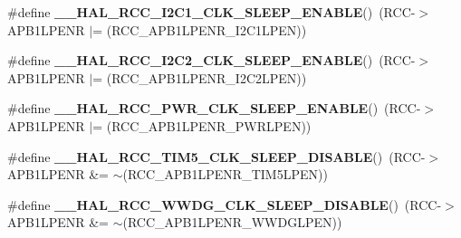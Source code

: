 \begin{DoxyCompactItemize}
\item 
\#define {\bfseries \+\_\+\+\_\+\+H\+A\+L\+\_\+\+R\+C\+C\+\_\+\+I2\+C1\+\_\+\+C\+L\+K\+\_\+\+S\+L\+E\+E\+P\+\_\+\+E\+N\+A\+B\+LE}()~(R\+CC-\/$>$A\+P\+B1\+L\+P\+E\+NR $\vert$= (R\+C\+C\+\_\+\+A\+P\+B1\+L\+P\+E\+N\+R\+\_\+\+I2\+C1\+L\+P\+EN))\hypertarget{group___r_c_c___a_p_b1___low_power___enable___disable_ga894dbeada170b01faef303d35de84917}{}\label{group___r_c_c___a_p_b1___low_power___enable___disable_ga894dbeada170b01faef303d35de84917}

\item 
\#define {\bfseries \+\_\+\+\_\+\+H\+A\+L\+\_\+\+R\+C\+C\+\_\+\+I2\+C2\+\_\+\+C\+L\+K\+\_\+\+S\+L\+E\+E\+P\+\_\+\+E\+N\+A\+B\+LE}()~(R\+CC-\/$>$A\+P\+B1\+L\+P\+E\+NR $\vert$= (R\+C\+C\+\_\+\+A\+P\+B1\+L\+P\+E\+N\+R\+\_\+\+I2\+C2\+L\+P\+EN))\hypertarget{group___r_c_c___a_p_b1___low_power___enable___disable_gac0167c77fa1c00add900bb1cf788e68c}{}\label{group___r_c_c___a_p_b1___low_power___enable___disable_gac0167c77fa1c00add900bb1cf788e68c}

\item 
\#define {\bfseries \+\_\+\+\_\+\+H\+A\+L\+\_\+\+R\+C\+C\+\_\+\+P\+W\+R\+\_\+\+C\+L\+K\+\_\+\+S\+L\+E\+E\+P\+\_\+\+E\+N\+A\+B\+LE}()~(R\+CC-\/$>$A\+P\+B1\+L\+P\+E\+NR $\vert$= (R\+C\+C\+\_\+\+A\+P\+B1\+L\+P\+E\+N\+R\+\_\+\+P\+W\+R\+L\+P\+EN))\hypertarget{group___r_c_c___a_p_b1___low_power___enable___disable_gacad9c9770ee2525fccf6a15e4ee7a07a}{}\label{group___r_c_c___a_p_b1___low_power___enable___disable_gacad9c9770ee2525fccf6a15e4ee7a07a}

\item 
\#define {\bfseries \+\_\+\+\_\+\+H\+A\+L\+\_\+\+R\+C\+C\+\_\+\+T\+I\+M5\+\_\+\+C\+L\+K\+\_\+\+S\+L\+E\+E\+P\+\_\+\+D\+I\+S\+A\+B\+LE}()~(R\+CC-\/$>$A\+P\+B1\+L\+P\+E\+NR \&= $\sim$(R\+C\+C\+\_\+\+A\+P\+B1\+L\+P\+E\+N\+R\+\_\+\+T\+I\+M5\+L\+P\+EN))\hypertarget{group___r_c_c___a_p_b1___low_power___enable___disable_gaac91e3596950c8d33760debce6b0e416}{}\label{group___r_c_c___a_p_b1___low_power___enable___disable_gaac91e3596950c8d33760debce6b0e416}

\item 
\#define {\bfseries \+\_\+\+\_\+\+H\+A\+L\+\_\+\+R\+C\+C\+\_\+\+W\+W\+D\+G\+\_\+\+C\+L\+K\+\_\+\+S\+L\+E\+E\+P\+\_\+\+D\+I\+S\+A\+B\+LE}()~(R\+CC-\/$>$A\+P\+B1\+L\+P\+E\+NR \&= $\sim$(R\+C\+C\+\_\+\+A\+P\+B1\+L\+P\+E\+N\+R\+\_\+\+W\+W\+D\+G\+L\+P\+EN))\hypertarget{group___r_c_c___a_p_b1___low_power___enable___disable_gae61c24ac6b36e7edbabc5b050b38d63e}{}\label{group___r_c_c___a_p_b1___low_power___enable___disable_gae61c24ac6b36e7edbabc5b050b38d63e}


\end{DoxyCompactItemize}
